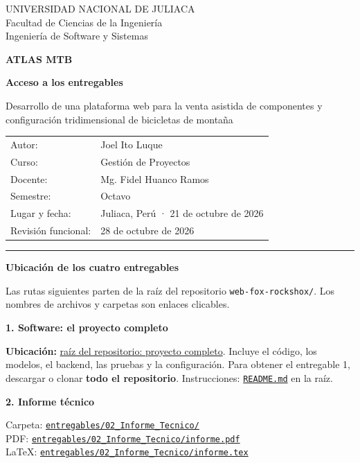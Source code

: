 \documentclass[11pt,a4paper]{article}
\newcommand{\repo}{https://github.com/joelito322/web-fox-rockshox}
\begin{document}
\raggedright
{\small UNIVERSIDAD NACIONAL DE JULIACA\\Facultad de Ciencias de la Ingeniería\\Ingeniería de Software y Sistemas}

\vspace{10pt}
{\Huge\bfseries\color{Atlas} ATLAS MTB}\par
{\large\bfseries Acceso a los entregables}

Desarrollo de una plataforma web para la venta asistida de componentes y configuración tridimensional de bicicletas de montaña

\begin{tabularx}{\textwidth}{@{}lX@{}}
Autor: & Joel Ito Luque\\
Curso: & Gestión de Proyectos\\
Docente: & Mg. Fidel Huanco Ramos\\
Semestre: & Octavo\\
Lugar y fecha: & Juliaca, Perú · 21 de octubre de 2026\\
Revisión funcional: & 28 de octubre de 2026
\end{tabularx}

\vspace{7pt}\textcolor{Acento}{\rule{\textwidth}{1pt}}

{\large\bfseries Ubicación de los cuatro entregables}\par
Las rutas siguientes parten de la raíz del repositorio \texttt{web-fox-rockshox/}. Los nombres de archivos y carpetas son enlaces clicables.

{\bfseries 1. Software: el proyecto completo}\par
{\small \textbf{Ubicación:} \href{\repo}{raíz del repositorio: proyecto completo}. Incluye el código, los modelos, el backend, las pruebas y la configuración. Para obtener el entregable 1, descargar o clonar \textbf{todo el repositorio}. Instrucciones: \href{\repo/blob/main/README.md}{\texttt{README.md}} en la raíz.}

{\bfseries 2. Informe técnico}\par
{\small Carpeta: \href{\repo/tree/main/entregables/02_Informe_Tecnico}{\nolinkurl{entregables/02_Informe_Tecnico/}}\\
PDF: \href{\repo/blob/main/entregables/02_Informe_Tecnico/informe.pdf}{\nolinkurl{entregables/02_Informe_Tecnico/informe.pdf}}\\
LaTeX: \href{\repo/blob/main/entregables/02_Informe_Tecnico/informe.tex}{\nolinkurl{entregables/02_Informe_Tecnico/informe.tex}}}
\end{document}
